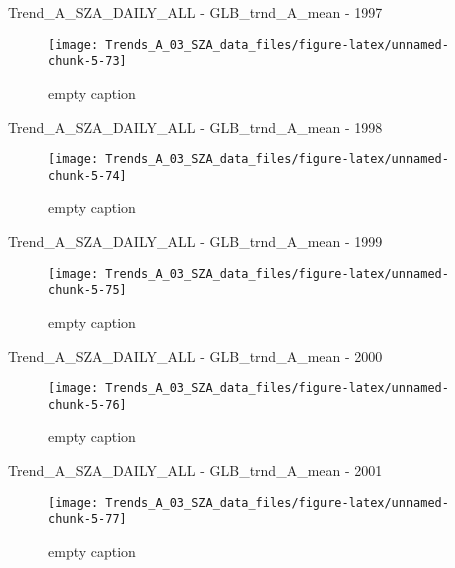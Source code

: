 \documentclass[
  10pt,
  a4paper,oneside]{article}
\begin{document}
Trend\_A\_SZA\_DAILY\_ALL - GLB\_trnd\_A\_mean - 1997

\begin{figure}[!ht]

{\centering \texttt{[image: Trends\_A\_03\_SZA\_data\_files/figure-latex/unnamed-chunk-5-73]} 

}

\caption{ empty caption }\label{fig:unnamed-chunk-5-73}
\end{figure}

Trend\_A\_SZA\_DAILY\_ALL - GLB\_trnd\_A\_mean - 1998

\begin{figure}[!ht]

{\centering \texttt{[image: Trends\_A\_03\_SZA\_data\_files/figure-latex/unnamed-chunk-5-74]} 

}

\caption{ empty caption }\label{fig:unnamed-chunk-5-74}
\end{figure}

Trend\_A\_SZA\_DAILY\_ALL - GLB\_trnd\_A\_mean - 1999

\begin{figure}[!ht]

{\centering \texttt{[image: Trends\_A\_03\_SZA\_data\_files/figure-latex/unnamed-chunk-5-75]} 

}

\caption{ empty caption }\label{fig:unnamed-chunk-5-75}
\end{figure}

Trend\_A\_SZA\_DAILY\_ALL - GLB\_trnd\_A\_mean - 2000

\begin{figure}[!ht]

{\centering \texttt{[image: Trends\_A\_03\_SZA\_data\_files/figure-latex/unnamed-chunk-5-76]} 

}

\caption{ empty caption }\label{fig:unnamed-chunk-5-76}
\end{figure}

Trend\_A\_SZA\_DAILY\_ALL - GLB\_trnd\_A\_mean - 2001

\begin{figure}[!ht]

{\centering \texttt{[image: Trends\_A\_03\_SZA\_data\_files/figure-latex/unnamed-chunk-5-77]} 

}

\caption{ empty caption }\label{fig:unnamed-chunk-5-77}
\end{figure}
\end{document}
